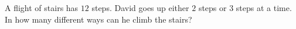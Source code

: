 A flight of stairs has $12$ steps. David goes up either $2$ steps or $3$ steps at a time. In how many different ways can he climb the stairs?
